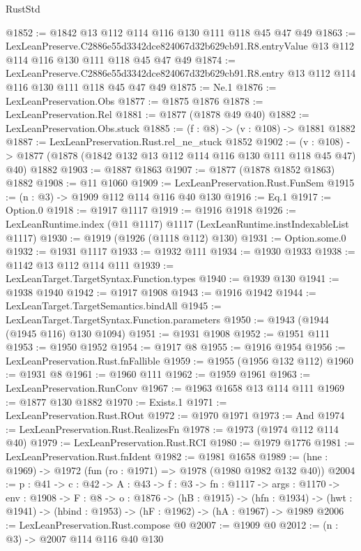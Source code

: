 \begin{lexlean}{RustStd}
\begin{coremodule}
@1852 := @1842 @13 @112 @114 @116 @130 @111 @118 @45 @47 @49
@1863 := LexLeanPreserve.C2886e55d3342dce824067d32b629cb91.R8.entryValue
    @13
    @112
    @114
    @116
    @130
    @111
    @118
    @45
    @47
    @49
@1874 := LexLeanPreserve.C2886e55d3342dce824067d32b629cb91.R8.entry
    @13
    @112
    @114
    @116
    @130
    @111
    @118
    @45
    @47
    @49
@1875 := Ne.{1}
@1876 := LexLeanPreservation.Obs
@1877 := @1875 @1876
@1878 := LexLeanPreservation.Rel
@1881 := @1877 (@1878 @49 @40)
@1882 := LexLeanPreservation.Obs.stuck
@1885 := (f : @8) -> (v : @108) -> @1881 @1882
@1887 := LexLeanPreservation.Rust.rel_ne_stuck @1852
@1902 := (v : @108) ->
  @1877 (@1878 (@1842 @132 @13 @112 @114 @116 @130 @111 @118 @45 @47) @40) @1882
@1903 := @1887 @1863
@1907 := @1877 (@1878 @1852 @1863) @1882
@1908 := @11 @1060
@1909 := LexLeanPreservation.Rust.FunSem
@1915 := (n : @3) -> @1909 @112 @114 @116 @40 @130
@1916 := Eq.{1}
@1917 := Option.{0}
@1918 := @1917 @1117
@1919 := @1916 @1918
@1926 := LexLeanRuntime.index (@11 @1117) @1117 (LexLeanRuntime.instIndexableList @1117)
@1930 := @1919 (@1926 (@1118 @112) @130)
@1931 := Option.some.{0}
@1932 := @1931 @1117
@1933 := @1932 @111
@1934 := @1930 @1933
@1938 := @1142 @13 @112 @114 @111
@1939 := LexLeanTarget.TargetSyntax.Function.types
@1940 := @1939 @130
@1941 := @1938 @1940
@1942 := @1917 @1908
@1943 := @1916 @1942
@1944 := LexLeanTarget.TargetSemantics.bindAll
@1945 := LexLeanTarget.TargetSyntax.Function.parameters
@1950 := @1943 (@1944 (@1945 @116) @130 @1094)
@1951 := @1931 @1908
@1952 := @1951 @111
@1953 := @1950 @1952
@1954 := @1917 @8
@1955 := @1916 @1954
@1956 := LexLeanPreservation.Rust.fnFallible
@1959 := @1955 (@1956 @132 @112)
@1960 := @1931 @8
@1961 := @1960 @111
@1962 := @1959 @1961
@1963 := LexLeanPreservation.RunConv
@1967 := @1963 @1658 @13 @114 @111
@1969 := @1877 @130 @1882
@1970 := Exists.{1}
@1971 := LexLeanPreservation.Rust.ROut
@1972 := @1970 @1971
@1973 := And
@1974 := LexLeanPreservation.Rust.RealizesFn
@1978 := @1973 (@1974 @112 @114 @40)
@1979 := LexLeanPreservation.Rust.RCI
@1980 := @1979 @1776
@1981 := LexLeanPreservation.Rust.fnIdent
@1982 := @1981 @1658
@1989 := (hne : @1969) -> @1972 (fun (ro : @1971) => @1978 (@1980 @1982 @132 @40))
@2004 := {p : @41} ->
  {c : @42} ->
  {A : @43} ->
  {f : @3} ->
  {fn : @1117} ->
  {args : @1170} ->
  {env : @1908} ->
  {F : @8} ->
  {o : @1876} ->
  (hB : @1915) ->
  (hfn : @1934) -> (hwt : @1941) -> (hbind : @1953) -> (hF : @1962) -> (hA : @1967) -> @1989
@2006 := LexLeanPreservation.Rust.compose @0
@2007 := @1909 @0
@2012 := (n : @3) -> @2007 @114 @116 @40 @130

\end{coremodule}
\end{lexlean}

